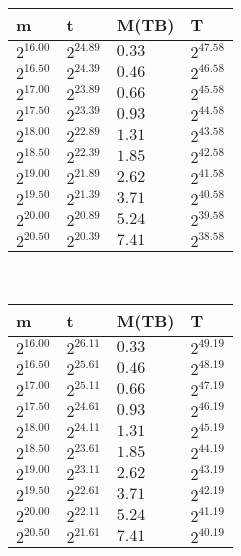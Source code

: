 \begin{tabular}{llll}
m & t & M(TB) & T \\ \hline
$2^{16.00}$ & $2^{24.89}$ & $0.33$ & $2^{47.58}$ \\
$2^{16.50}$ & $2^{24.39}$ & $0.46$ & $2^{46.58}$ \\
$2^{17.00}$ & $2^{23.89}$ & $0.66$ & $2^{45.58}$ \\
$2^{17.50}$ & $2^{23.39}$ & $0.93$ & $2^{44.58}$ \\
$2^{18.00}$ & $2^{22.89}$ & $1.31$ & $2^{43.58}$ \\
$2^{18.50}$ & $2^{22.39}$ & $1.85$ & $2^{42.58}$ \\
$2^{19.00}$ & $2^{21.89}$ & $2.62$ & $2^{41.58}$ \\
$2^{19.50}$ & $2^{21.39}$ & $3.71$ & $2^{40.58}$ \\
$2^{20.00}$ & $2^{20.89}$ & $5.24$ & $2^{39.58}$ \\
$2^{20.50}$ & $2^{20.39}$ & $7.41$ & $2^{38.58}$ \\
\end{tabular}
 \ 
\begin{tabular}{llll}
m & t & M(TB) & T \\ \hline
$2^{16.00}$ & $2^{26.11}$ & $0.33$ & $2^{49.19}$ \\
$2^{16.50}$ & $2^{25.61}$ & $0.46$ & $2^{48.19}$ \\
$2^{17.00}$ & $2^{25.11}$ & $0.66$ & $2^{47.19}$ \\
$2^{17.50}$ & $2^{24.61}$ & $0.93$ & $2^{46.19}$ \\
$2^{18.00}$ & $2^{24.11}$ & $1.31$ & $2^{45.19}$ \\
$2^{18.50}$ & $2^{23.61}$ & $1.85$ & $2^{44.19}$ \\
$2^{19.00}$ & $2^{23.11}$ & $2.62$ & $2^{43.19}$ \\
$2^{19.50}$ & $2^{22.61}$ & $3.71$ & $2^{42.19}$ \\
$2^{20.00}$ & $2^{22.11}$ & $5.24$ & $2^{41.19}$ \\
$2^{20.50}$ & $2^{21.61}$ & $7.41$ & $2^{40.19}$ \\
\end{tabular}
 \ 
